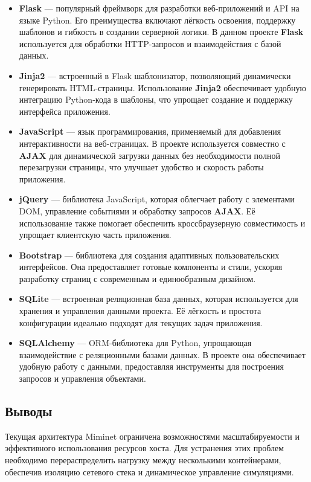     \begin{itemize}
        \item \textbf{Flask} — популярный фреймворк для разработки веб-приложений и API на языке Python\cite{python}. Его преимущества включают лёгкость освоения, поддержку шаблонов и гибкость в создании серверной логики. В данном проекте \textbf{Flask} используется для обработки HTTP-запросов и взаимодействия с базой данных.
        \item \textbf{Jinja2} — встроенный в Flask шаблонизатор, позволяющий динамически генерировать HTML-страницы. Использование \textbf{Jinja2} обеспечивает удобную интеграцию Python\cite{python}-кода в шаблоны, что упрощает создание и поддержку интерфейса приложения.
        \item \textbf{JavaScript} — язык программирования, применяемый для добавления интерактивности на веб-страницах. В проекте используется совместно с \textbf{AJAX} для динамической загрузки данных без необходимости полной перезагрузки страницы, что улучшает удобство и скорость работы приложения.
        \item \textbf{jQuery} — библиотека JavaScript, которая облегчает работу с элементами DOM, управление событиями и обработку запросов \textbf{AJAX}. Её использование также помогает обеспечить кроссбраузерную совместимость и упрощает клиентскую часть приложения.
        \item \textbf{Bootstrap} — библиотека для создания адаптивных пользовательских интерфейсов. Она предоставляет готовые компоненты и стили, ускоряя разработку страниц с современным и единообразным дизайном.
        \item \textbf{SQLite} — встроенная реляционная база данных, которая используется для хранения и управления данными проекта. Её лёгкость и простота конфигурации идеально подходят для текущих задач приложения.
        \item \textbf{SQLAlchemy} — ORM-библиотека для Python\cite{python}, упрощающая взаимодействие с реляционными базами данных. В проекте она обеспечивает удобную работу с данными, предоставляя инструменты для построения запросов и управления объектами.
    \end{itemize}

\subsection{Выводы}

Текущая архитектура Miminet ограничена возможностями масштабируемости и эффективного использования ресурсов хоста.
Для устранения этих проблем необходимо перераспределить нагрузку между несколькими контейнерами, обеспечив изоляцию сетевого стека и динамическое управление симуляциями.
